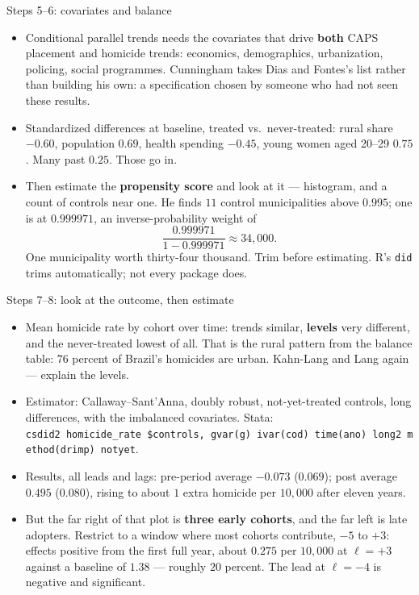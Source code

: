 \documentclass[
  11pt,
  ignorenonframetext,
  aspectratio=169,
]{beamer}
\providecommand{\tightlist}{%
  \setlength{\itemsep}{0pt}\setlength{\parskip}{0pt}}
\begin{document}
\begin{frame}[fragile]{Steps 5--6: covariates and balance}
\protect{}\label{steps-56-covariates-and-balance}
\begin{itemize}
\tightlist
\item
  Conditional parallel trends needs the covariates that drive
  \textbf{both} CAPS placement and homicide trends: economics,
  demographics, urbanization, policing, social programmes. Cunningham
  takes Dias and Fontes's list rather than building his own: a
  specification chosen by someone who had not seen these results.
\item
  Standardized differences at baseline, treated vs.~never-treated: rural
  share \(-0.60\), population \(0.69\), health spending \(-0.45\), young
  women aged 20--29 \(0.75\). Many past \(0.25\). Those go in.
\item
  Then estimate the \textbf{propensity score} and look at it ---
  histogram, and a count of controls near one. He finds \(11\) control
  municipalities above \(0.995\); one is at \(0.999971\), an
  inverse-probability weight of \[
  \frac{0.999971}{1 - 0.999971} \approx 34{,}000 .
  \] One municipality worth thirty-four thousand. Trim before
  estimating. R's \texttt{did} trims automatically; not every package
  does.
\end{itemize}
\end{frame}

\begin{frame}[fragile]{Steps 7--8: look at the outcome, then estimate}
\protect{}\label{steps-78-look-at-the-outcome-then-estimate}
\begin{itemize}
\tightlist
\item
  Mean homicide rate by cohort over time: trends similar,
  \textbf{levels} very different, and the never-treated lowest of all.
  That is the rural pattern from the balance table: \(76\) percent of
  Brazil's homicides are urban. Kahn-Lang and Lang again --- explain the
  levels.
\item
  Estimator: Callaway--Sant'Anna, doubly robust, not-yet-treated
  controls, long differences, with the imbalanced covariates. Stata:
  \texttt{csdid2\ homicide\_rate\ \$controls,\ gvar(g)\ ivar(cod)\ time(ano)\ long2\ method(drimp)\ notyet}.
\item
  Results, all leads and lags: pre-period average \(-0.073\)
  (\(0.069\)); post average \(0.495\) (\(0.080\)), rising to about \(1\)
  extra homicide per \(10{,}000\) after eleven years.
\item
  But the far right of that plot is \textbf{three early cohorts}, and
  the far left is late adopters. Restrict to a window where most cohorts
  contribute, \(-5\) to \(+3\): effects positive from the first full
  year, about \(0.275\) per \(10{,}000\) at \(\ell = +3\) against a
  baseline of \(1.38\) --- roughly \(20\) percent. The lead at
  \(\ell = -4\) is negative and significant.
\end{itemize}
\end{frame}
\end{document}
